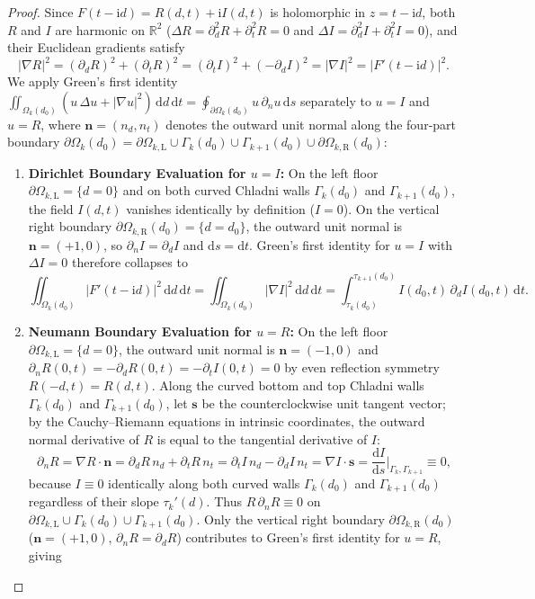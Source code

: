 \documentclass[11pt,reqno]{amsart}
\theoremstyle{definition}
\theoremstyle{remark}
\numberwithin{equation}{section}
\newcommand{\dd}{\mathrm{d}}
\newcommand{\ii}{\mathrm{i}}
\begin{document}
\begin{proof}
Since $F(t-\ii d) = R(d,t) + \ii I(d,t)$ is holomorphic in $z = t - \ii d$, both $R$ and $I$ are harmonic on $\mathbb{R}^2$ ($\Delta R = \partial_d^2 R + \partial_t^2 R = 0$ and $\Delta I = \partial_d^2 I + \partial_t^2 I = 0$), and their Euclidean gradients satisfy
\[
|\nabla R|^2 = (\partial_d R)^2 + (\partial_t R)^2 = (\partial_t I)^2 + (-\partial_d I)^2 = |\nabla I|^2 = \bigl|F'(t-\ii d)\bigr|^2.
\]
We apply Green's first identity $\iint_{\Omega_k(d_0)} (u\,\Delta u + |\nabla u|^2)\,\dd d\,\dd t = \oint_{\partial\Omega_k(d_0)} u\,\partial_n u\,\dd s$ separately to $u = I$ and $u = R$, where $\mathbf{n} = (n_d, n_t)$ denotes the outward unit normal along the four-part boundary $\partial\Omega_k(d_0) = \partial\Omega_{k,\mathrm{L}} \cup \Gamma_k(d_0) \cup \Gamma_{k+1}(d_0) \cup \partial\Omega_{k,\mathrm{R}}(d_0)$:
\begin{enumerate}[label=(\roman*),leftmargin=2.0em]
\item \textbf{Dirichlet Boundary Evaluation for $u = I$:} On the left floor $\partial\Omega_{k,\mathrm{L}} = \{d=0\}$ and on both curved Chladni walls $\Gamma_k(d_0)$ and $\Gamma_{k+1}(d_0)$, the field $I(d,t)$ vanishes identically by definition ($I=0$). On the vertical right boundary $\partial\Omega_{k,\mathrm{R}}(d_0) = \{d=d_0\}$, the outward unit normal is $\mathbf{n} = (+1,0)$, so $\partial_n I = \partial_d I$ and $\dd s = \dd t$. Green's first identity for $u=I$ with $\Delta I = 0$ therefore collapses to
\[
\iint_{\Omega_k(d_0)} \bigl|F'(t-\ii d)\bigr|^2\,\dd d\,\dd t = \iint_{\Omega_k(d_0)} |\nabla I|^2\,\dd d\,\dd t = \int_{\tau_k(d_0)}^{\tau_{k+1}(d_0)} I(d_0,t)\,\partial_d I(d_0,t)\,\dd t.
\]
\item \textbf{Neumann Boundary Evaluation for $u = R$:} On the left floor $\partial\Omega_{k,\mathrm{L}} = \{d=0\}$, the outward unit normal is $\mathbf{n} = (-1,0)$ and $\partial_n R(0,t) = -\partial_d R(0,t) = -\partial_t I(0,t) = 0$ by even reflection symmetry $R(-d,t)=R(d,t)$. Along the curved bottom and top Chladni walls $\Gamma_k(d_0)$ and $\Gamma_{k+1}(d_0)$, let $\mathbf{s}$ be the counterclockwise unit tangent vector; by the Cauchy--Riemann equations in intrinsic coordinates, the outward normal derivative of $R$ is equal to the tangential derivative of $I$:
\[
\partial_n R = \nabla R \cdot \mathbf{n} = \partial_d R\,n_d + \partial_t R\,n_t = \partial_t I\,n_d - \partial_d I\,n_t = \nabla I \cdot \mathbf{s} = \frac{\dd I}{\dd s}\Big|_{\Gamma_{k},\Gamma_{k+1}} \equiv 0,
\]
because $I \equiv 0$ identically along both curved walls $\Gamma_k(d_0)$ and $\Gamma_{k+1}(d_0)$ regardless of their slope $\tau_k'(d)$. Thus $R\,\partial_n R \equiv 0$ on $\partial\Omega_{k,\mathrm{L}} \cup \Gamma_k(d_0) \cup \Gamma_{k+1}(d_0)$. Only the vertical right boundary $\partial\Omega_{k,\mathrm{R}}(d_0)$ ($\mathbf{n}=(+1,0)$, $\partial_n R = \partial_d R$) contributes to Green's first identity for $u=R$, giving

\end{enumerate}
\end{proof}
\end{document}
